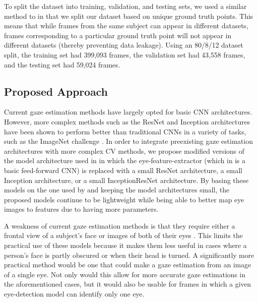 \documentclass{article}
\begin{document}
To split the dataset into training, validation, and testing sets, we used a similar method to \cite{googlepaper} in that we split our dataset based on unique ground truth points. This means that while frames from the same subject can appear in different datasets, frames corresponding to a particular ground truth point will not appear in different datasets (thereby preventing data leakage). Using an 80/8/12 dataset split, the training set had 399,093 frames, the validation set had 43,558 frames, and the testing set had 59,024 frames.

\subsection{Proposed Approach}
Current gaze estimation methods have largely opted for basic CNN architectures. However, more complex methods such as the ResNet and Inception architectures have been shown to perform better than traditional CNNs in a variety of tasks, such as the ImageNet challenge \cite{resnetpaper, inceptionpaper}. In order to integrate preexisting gaze estimation architectures with more complex CV methods, we propose modified versions of the model architecture used in \cite{googlepaper} in which the eye-feature-extractor (which in \cite{googlepaper} is a basic feed-forward CNN) is replaced with a small ResNet architecture, a small Inception architecture, or a small InceptionResNet architecture. By basing these models on the one used by \cite{googlepaper} and keeping the model architectures small, the proposed models continue to be lightweight while being able to better map eye images to features due to having more parameters.

A weakness of current gaze estimation methods is that they require either a frontal view of a subject's face or images of both of their eyes \cite{mitpaper, googlepaper}. This limits the practical use of these models because it makes them less useful in cases where a person's face is partly obscured or when their head is turned. A significantly more practical method would be one that could make a gaze estimation from an image of a single eye. Not only would this allow for more accurate gaze estimations in the aforementioned cases, but it would also be usable for frames in which a given eye-detection model can identify only one eye.
\end{document}
